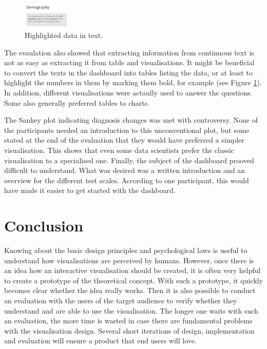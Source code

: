 \documentclass[11pt]{article}
\begin{document}
\begin{figure}
    \includegraphics[width=0.2\textwidth]{./info-in-text.png}
    \caption{Highlighted data in text.}
    \label{info-in-text}
\end{figure}

The evaulation also showed that extracting information from continuous text is not as easy as extracting it from table and visualisations. It might be beneficial to convert the texts in the dashboard into tables listing the data, or at least to highlight the numbers in them by marking them bold, for example (see Figure \ref{info-in-text}). In addition, different visualisations were actaully used to answer the questions. Some also generally preferred tables to charts.

The Sankey plot indicating diagnosis changes was met with controversy. None of the participants needed an introduction to this unconventional plot, but some stated at the end of the evaluation that they would have preferred a simpler visualisation. This shows that even some data scientists prefer the classic visualisation to a specialised one. Finally, the subject of the dashboard prooved difficult to understand. What was desired was a written introduction and an overview for the different test scales. According to one participant, this would have made it easier to get started with the dashboard.

\section{Conclusion}

Knowing about the basic design principles and psychological laws is useful to understand how visualisations are perceived by humans. However, once there is an idea how an interactive visualisation should be created, it is often very helpful to create a prototype of the theoretical concept. With such a prototype, it quickly becomes clear whether the idea really works. Then it is also possible to conduct an evaluation with the users of the target audience to verify whether they understand and are able to use the visualisation. The longer one waits with such an evaluation, the more time is wasted in case there are fundamental problems with the visualisation design. Several short iterations of design, implementation and evaluation will ensure a product that end users will love.
\end{document}
